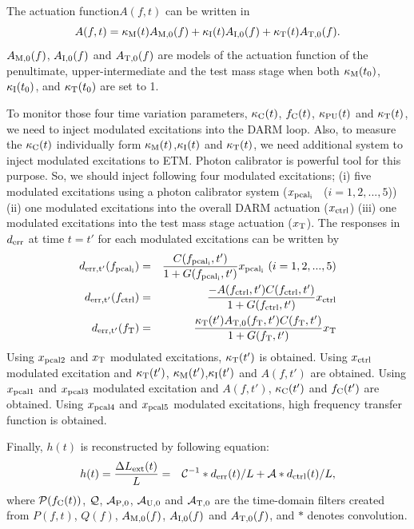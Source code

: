 The actuation function$A(f,t)$ can be written in
\begin{equation}
A(f,t) = \kappa_{\rm M}(t)A_{\rm M,0}(f)+\kappa_{\rm I}(t)A_{\rm I,0}(f) + \kappa_{\rm T}(t) A_{\rm T,0}(f).
\end{equation}
$A_{\rm M,0}(f)$, $A_{\rm I,0}(f)$ and $A_{\rm T,0}(f)$ are models of the actuation function 
of the penultimate, upper-intermediate and the test mass stage 
when both $\kappa_{\rm M}(t_0)$, $\kappa_{\rm I}(t_0)$, and $\kappa_{\rm T}(t_0)$ are set to 1.

To monitor those four time variation parameters, 
$\kappa_{\rm C}(t)$, $f_{\rm C}(t)$, $\kappa_{\rm PU}(t)$ and $\kappa_{\rm T}(t)$, 
we need to inject modulated excitations into the DARM loop.
Also, to measure the $\kappa_{\rm C}(t)$ individually form $\kappa_{\rm M}(t)$,$\kappa_{\rm I}(t)$ and $\kappa_{\rm T}(t)$,
we need additional system to inject modulated excitations to ETM.
Photon calibrator is powerful tool for this purpose.
So, we should inject following four modulated excitations;
(i) five modulated excitations using a photon calibrator system ($x_{\rm pcal_i}$ ~($i=1,2,...,5$))
(ii) one modulated excitations into the overall DARM actuation ($x_{\rm ctrl}$)
(iii) one modulated excitations into the test mass stage actuation ($x_{\rm T}$).
The responses in $d_{\rm err}$ at time $t=t'$ for each modulated excitations can be written by
\begin{eqnarray}
d_{\rm err, t'}(f_{\rm pcal_i}) &=& \frac{C(f_{\rm pcal_i},t')}{1+G(f_{\rm pcal_i},t')} x_{\rm pcal_i} ~ (i=1,2, ..., 5) \\
d_{\rm err, t'}(f_{\rm ctrl}) &=& \frac{-A(f_{\rm ctrl}, t')C(f_{\rm ctrl},t')}{1+G(f_{\rm ctrl},t')} x_{\rm ctrl}  \\
d_{\rm err, t'}(f_{\rm T}) &=& \frac{\kappa_{\rm T}(t') A_{\rm T,0}(f_{\rm T}, t')C(f_{\rm T},t')}{1+G(f_{\rm T},t')} x_{\rm T} 
\end{eqnarray}
Using $x_{\rm pcal2}$ and $x_{\rm T}$ modulated excitations, $\kappa_{\rm T}(t')$ is obtained.
Using $x_{\rm ctrl}$ modulated excitation and $\kappa_{\rm T}(t')$, $\kappa_{\rm M}(t')$,$\kappa_{\rm I}(t')$ and $A(f,t')$ are obtained. 
Using $x_{\rm pcal1}$ and $x_{\rm pcal3}$ modulated excitation and $A(f,t')$, $\kappa_{\rm C}(t')$ and $f_{\rm C}(t')$ are obtained.
Using $x_{\rm pcal4}$ and $x_{\rm pcal5}$ modulated excitations, high frequency transfer function is obtained.

Finally, $h(t)$ is reconstructed by following equation:
\begin{eqnarray}
h(t)=\frac{\Delta L_{\rm ext}(t)}{L} &= &{\cal C} ^{-1} * d_{\rm err}(t)/L  +  {\cal A}* d_{\rm ctrl}(t)/L ,
\end{eqnarray}
where ${\cal P}(f_{\rm C}(t))$, ${\cal Q}$, ${\cal A_{\rm P,0}}$, ${\cal A_{\rm U,0}}$ and ${\cal A_{\rm T,0}}$  
are the time-domain filters created from $P(f,t)$, $Q(f)$, $A_{\rm M,0}(f)$, $A_{\rm I,0}(f)$ and $A_{\rm T,0}(f)$, and $*$ denotes convolution.

